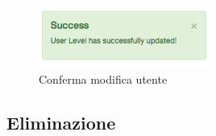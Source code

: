 \begin{enumerate}
					\begin{figure}[H]
						\centering \includegraphics[width=0.5\textwidth]{img/confirmEditUser.png}
						\caption{ \label{fig:confirmEditUser} Conferma modifica utente}
					\end{figure}

			\end{enumerate}  
		
	
	\clearpage
	\subsection{Eliminazione} %
	\label{utenti-eliminazione}
